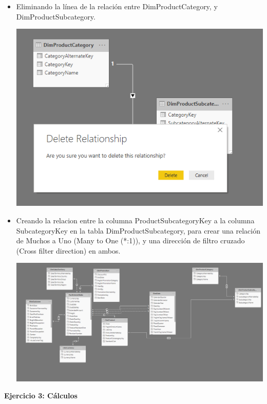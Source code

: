 \begin{itemize}
	\item Eliminando la línea de la relación entre DimProductCategory, y DimProductSubcategory.
	\begin{center}
	\includegraphics[width=13cm]{./Imagenes/Captura2-3} 
	\end{center}
\end{itemize} 

\begin{itemize}
	\item Creando la relacion entre la columna ProductSubcategoryKey a la columna SubcategoryKey en la tabla DimProductSubcategory, para crear una relación de Muchos a Uno (Many to One (*:1)), y una dirección de filtro cruzado (Cross filter direction) en ambos.
	\begin{center}
	\includegraphics[width=13cm]{./Imagenes/Captura2-4} 
	\end{center}
\end{itemize} 


\textbf{Ejercicio 3: Cálculos}


